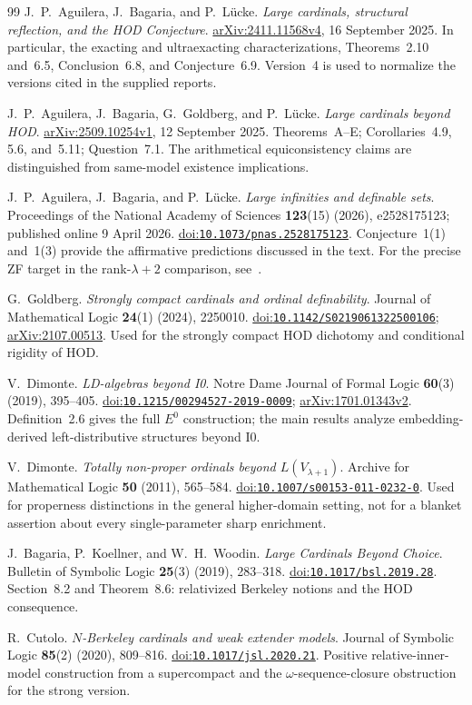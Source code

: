 \documentclass[11pt,letterpaper]{article}
\theoremstyle{definition}
\newcommand{\Izero}{\mathrm{I0}}
\newcommand{\arxiv}[1]{\href{https://arxiv.org/abs/#1}{arXiv:#1}}
\newcommand{\doi}[1]{\href{https://doi.org/#1}{doi:\nolinkurl{#1}}}
\begin{document}
\begin{thebibliography}{99}
J.~P.~Aguilera, J.~Bagaria, and P.~L\"ucke.
\emph{Large cardinals, structural reflection, and the HOD Conjecture}.
\arxiv{2411.11568v4}, 16 September 2025.
In particular, the exacting and ultraexacting characterizations, Theorems~2.10 and~6.5, Conclusion~6.8, and Conjecture~6.9. Version~4 is used to normalize the versions cited in the supplied reports.

J.~P.~Aguilera, J.~Bagaria, G.~Goldberg, and P.~L\"ucke.
\emph{Large cardinals beyond HOD}.
\arxiv{2509.10254v1}, 12 September 2025.
Theorems~A--E; Corollaries~4.9, 5.6, and~5.11; Question~7.1. The arithmetical equiconsistency claims are distinguished from same-model existence implications.

J.~P.~Aguilera, J.~Bagaria, and P.~L\"ucke.
\emph{Large infinities and definable sets}.
Proceedings of the National Academy of Sciences \textbf{123}(15) (2026), e2528175123; published online 9 April 2026.
\doi{10.1073/pnas.2528175123}.
Conjecture~1(1) and~1(3) provide the affirmative predictions discussed in the text. For the precise ZF target in the rank-$\lambda+2$ comparison, see~\cite{schlutzenberg}.

G.~Goldberg. \emph{Strongly compact cardinals and ordinal definability}.
Journal of Mathematical Logic \textbf{24}(1) (2024), 2250010.
\doi{10.1142/S0219061322500106}; \arxiv{2107.00513}.
Used for the strongly compact HOD dichotomy and conditional rigidity of HOD.

V.~Dimonte. \emph{LD-algebras beyond I0}.
Notre Dame Journal of Formal Logic \textbf{60}(3) (2019), 395--405.
\doi{10.1215/00294527-2019-0009}; \arxiv{1701.01343v2}.
Definition~2.6 gives the full $E^0$ construction; the main results analyze embedding-derived left-distributive structures beyond $\Izero$.

V.~Dimonte. \emph{Totally non-proper ordinals beyond $L(V_{\lambda+1})$}.
Archive for Mathematical Logic \textbf{50} (2011), 565--584.
\doi{10.1007/s00153-011-0232-0}.
Used for properness distinctions in the general higher-domain setting, not for a blanket assertion about every single-parameter sharp enrichment.

J.~Bagaria, P.~Koellner, and W.~H.~Woodin.
\emph{Large Cardinals Beyond Choice}.
Bulletin of Symbolic Logic \textbf{25}(3) (2019), 283--318.
\doi{10.1017/bsl.2019.28}.
Section~8.2 and Theorem~8.6: relativized Berkeley notions and the HOD consequence.

R.~Cutolo. \emph{$N$-Berkeley cardinals and weak extender models}.
Journal of Symbolic Logic \textbf{85}(2) (2020), 809--816.
\doi{10.1017/jsl.2020.21}.
Positive relative-inner-model construction from a supercompact and the $\omega$-sequence-closure obstruction for the strong version.


\end{thebibliography}
\end{document}
